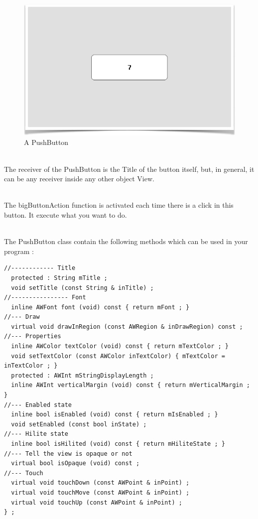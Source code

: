 \documentclass[a4paper,11pt]{extarticle}
\begin{document}
\begin{figure}[htbp]
   \centering
   \includegraphics[scale=0.7]{AWFig10.png} 
   \caption{A PushButton}
   \label{fig: 10}
\end{figure}

~\\ The receiver of the PushButton is the Title of the button itself, but, in general, it can be any receiver inside any other object View.

~\\ The bigButtonAction function is activated each time there is a click in this button. It execute what you want to do.
  
~\\ The PushButton class contain the following methods which can be used in your program :

\begin{lstlisting}[language=Arduinonl]
//------------ Title
  protected : String mTitle ;
  void setTitle (const String & inTitle) ;
//---------------- Font
  inline AWFont font (void) const { return mFont ; }
//--- Draw
  virtual void drawInRegion (const AWRegion & inDrawRegion) const ;
//--- Properties
  inline AWColor textColor (void) const { return mTextColor ; }
  void setTextColor (const AWColor inTextColor) { mTextColor = inTextColor ; }  
  protected : AWInt mStringDisplayLength ;
  inline AWInt verticalMargin (void) const { return mVerticalMargin ; }
//--- Enabled state
  inline bool isEnabled (void) const { return mIsEnabled ; }
  void setEnabled (const bool inState) ;
//--- Hilite state
  inline bool isHilited (void) const { return mHiliteState ; }
//--- Tell the view is opaque or not
  virtual bool isOpaque (void) const ;
//--- Touch
  virtual void touchDown (const AWPoint & inPoint) ;
  virtual void touchMove (const AWPoint & inPoint) ;
  virtual void touchUp (const AWPoint & inPoint) ;
} ;
\end{lstlisting}
\end{document}
